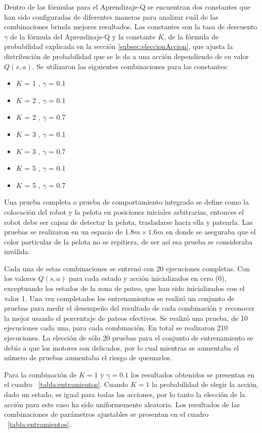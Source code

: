 Dentro de las fórmulas para el Aprendizaje-Q se encuentran dos constantes que han sido configuradas de diferentes maneras para analizar cuál de las combinaciones brinda mejores resultados. Las constantes son la tasa de descuento $\gamma$ de la fórmula del Aprendizaje-Q y la constante $K$, de la fórmula de probabilidad explicada en la secci\'on \ref{subsec:eleccionAccion}, que ajusta la distribución de probabilidad que se le da a una acción dependiendo de su valor $Q(s,a)$. Se utilizaron las siguientes combinaciones para las constantes:

\begin{itemize}
 \setlength\itemsep{0.3pt}
\item $K$ = 1 , $\gamma$ = 0.1
\item $K$ = 2 , $\gamma$ = 0.1 
\item $K$ = 2 , $\gamma$ = 0.7
\item $K$ = 3 , $\gamma$ = 0.1
\item $K$ = 3 , $\gamma$ = 0.7
\item $K$ = 5 , $\gamma$ = 0.1
\item $K$ = 5 , $\gamma$ = 0.7
   
\end{itemize}

Una prueba completa o prueba de comportamiento integrado se define como la colocaci\'on del robot y la pelota en posiciones iniciales arbitrarias, entonces el robot debe ser capaz de detectar la pelota, trasladarse hacia ella y patearla. Las pruebas se realizaron en un espacio de $1.8 m \times 1.6 m$
en donde se aseguraba que el color particular de la pelota no se repitiera, de ser así esa prueba se consideraba inválida.

Cada una de estas combinaciones se entrenó con 20 ejecuciones completas. Con los valores $Q(s,a)$ para cada estado y acción inicializados en cero (0), exceptuando los estados de la zona de pateo, que han sido inicializados con el valor 1. Una vez completados los entrenamientos se realizó un conjunto de pruebas para medir el desempeño del resultado de cada combinación y reconocer la mejor usando el porcentaje de pateos efectivos. Se realizó una prueba, de 10 ejecuciones cada una, para cada combinación. En total se realizaron 210 ejecuciones. La elecci\'on de s\'olo 20 pruebas para el conjunto de entrenamiento se deb\'io a que los motores son delicados, por lo cual mientras se aumentaba el n\'umero de pruebas aumentaba el riesgo de quemarlos.

Para la combinaci\'on de $K = 1$ y $ \gamma = 0.1 $ los resultados obtenidos se presentan en el cuadro ~\ref{tabla:entramientos}. Cuando $K = 1$ la probabilidad de elegir la acci\'on, dado un estado, es igual para todas las acciones, por lo tanto la elección de la acción para este caso ha sido uniformemente aleatoria. Los resultados de las combinaciones de par\'ametros ajustables se presentan en el cuadro ~\ref{tabla:entramientos}.

